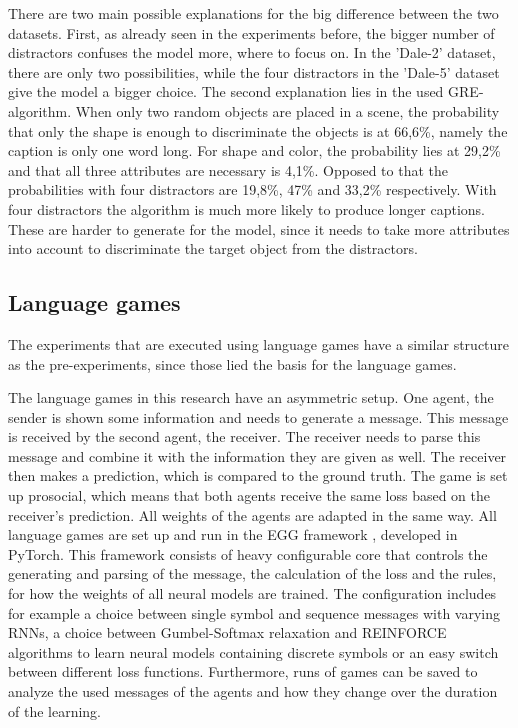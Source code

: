 There are two main possible explanations for the big difference between the two datasets.
First, as already seen in the experiments before, the bigger number of distractors confuses the model more, where to focus on.
In the 'Dale-2' dataset, there are only two possibilities, while the four distractors in the 'Dale-5' dataset give the model a bigger choice.
The second explanation lies in the used GRE-algorithm.
When only two random objects are placed in a scene, the probability that only the shape is enough to discriminate the objects is at 66,6\%, namely the caption is only one word long.
For shape and color, the probability lies at 29,2\% and that all three attributes are necessary is 4,1\%.
Opposed to that the probabilities with four distractors are 19,8\%, 47\% and 33,2\% respectively.
With four distractors the algorithm is much more likely to produce longer captions.
These are harder to generate for the model, since it needs to take more attributes into account to discriminate the target object from the distractors.

\subsection{Language games}

The experiments that are executed using language games have a similar structure as the pre-experiments, since those lied the basis for the language games.

The language games in this research have an asymmetric setup.
One agent, the sender is shown some information and needs to generate a message.
This message is received by the second agent, the receiver.
The receiver needs to parse this message and combine it with the information they are given as well.
The receiver then makes a prediction, which is compared to the ground truth.
The game is set up prosocial, which means that both agents receive the same loss based on the receiver's prediction.
All weights of the agents are adapted in the same way.
All language games are set up and run in the EGG framework \citep{Kharitonov2019}, developed in PyTorch.
This framework consists of heavy configurable core that controls the generating and parsing of the message, the calculation of the loss and the rules, for how the weights of all neural models are trained.
The configuration includes for example a choice between single symbol and sequence messages with varying RNNs, a choice between Gumbel-Softmax relaxation and REINFORCE algorithms to learn neural models containing discrete symbols or an easy switch between different loss functions.
Furthermore, runs of games can be saved to analyze the used messages of the agents and how they change over the duration of the learning.

